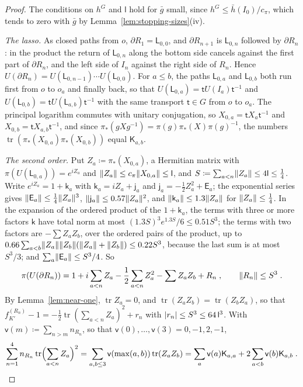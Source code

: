 \documentclass[11pt]{preprint}
\newcommand{\tr}{\operatorname{tr}}
\DeclarePairedDelimiter{\abs}{\lvert}{\rvert}
\DeclarePairedDelimiter{\norm}{\lVert}{\rVert}
\numberwithin{equation}{section}
\theoremstyle{definition}
\theoremstyle{remark}
\theoremstyle{plain}
\begin{document}
\begin{proof}
The conditions on $h^G$ and $\mathsf l$ hold for $\bar g$ small, since $h^G \leq \bar h(I_0)/c_\pi$, which tends to zero with $\bar g$ by Lemma~\ref{lem:stopping-sizes}(iv).

\emph{The lasso.} As closed paths from $o$, $\partial R_1 = \mathsf L_{0,0}$, and $\partial R_{n+1}$ is $\mathsf L_{0,n}$ followed by $\partial R_n$: in the product the return of $\mathsf L_{0,n}$ along the bottom side cancels against the first part of $\partial R_n$, and the left side of $I_n$ against the right side of $R_n$. Hence $U(\partial R_n) = U(\mathsf L_{0,n-1})\cdots U(\mathsf L_{0,0})$. For $a \leq b$, the paths $\mathsf L_{0,a}$ and $\mathsf L_{0,b}$ both run first from $o$ to $o_a$ and finally back, so that $U(\mathsf L_{0,a}) = \mathsf tU(I_a)\mathsf t^{-1}$ and $U(\mathsf L_{0,b}) = \mathsf tU(\mathsf L_{a,b})\mathsf t^{-1}$ with the same transport $\mathsf t \in G$ from $o$ to $o_a$. The principal logarithm commutes with unitary conjugation, so $X_{0,a} = \mathsf tX_a\mathsf t^{-1}$ and $X_{0,b} = \mathsf tX_{a,b}\mathsf t^{-1}$, and since $\pi_*(gXg^{-1}) = \pi(g)\pi_*(X)\pi(g)^{-1}$, the numbers $\tr(\pi_*(X_{0,a})\pi_*(X_{0,b}))$ equal $\mathsf K_{a,b}$.

\emph{The second order.} Put $Z_a \coloneqq \pi_*(X_{0,a})$, a Hermitian matrix with $\pi(U(\mathsf L_{0,a})) = e^{iZ_a}$ and $\norm{Z_a} \leq c_\pi\norm{X_{0,a}} \leq \mathsf l$, and $S \coloneqq \sum_{a<n}\norm{Z_a} \leq 4\mathsf l \leq \frac14$. Write $e^{iZ_a} = 1 + \mathsf k_a$ with $\mathsf k_a = iZ_a + \mathsf j_a$ and $\mathsf j_a = -\frac12Z_a^2 + \mathsf E_a$; the exponential series gives $\norm{\mathsf E_a} \leq \frac14\norm{Z_a}^3$, $\norm{\mathsf j_a} \leq 0.57\norm{Z_a}^2$, and $\norm{\mathsf k_a} \leq 1.3\norm{Z_a}$ for $\norm{Z_a} \leq \frac14$. In the expansion of the ordered product of the $1 + \mathsf k_a$, the terms with three or more factors $\mathsf k$ have total norm at most $(1.3S)^3e^{1.3S}/6 \leq 0.51S^3$; the terms with two factors are $-\sum Z_aZ_b$, over the ordered pairs of the product, up to $0.66\sum_{a<b}\norm{Z_a}\norm{Z_b}(\norm{Z_a} + \norm{Z_b}) \leq 0.22S^3$, because the last sum is at most $S^3/3$; and $\sum_a\norm{\mathsf E_a} \leq S^3/4$. So
\begin{equation}\label{eq:lasso-expansion}
    \pi(U(\partial R_n)) = 1 + i\sum_{a<n}Z_a - \frac12\sum_{a<n}Z_a^2 - \sum Z_aZ_b + R_n\;,
    \qquad
    \norm{R_n} \leq S^3\;.
\end{equation}
By Lemma~\ref{lem:near-one}, $\tr Z_a = 0$, and $\tr(Z_aZ_b) = \tr(Z_bZ_a)$, so that $f^{(R_n)}_{K'} - 1 = -\frac12\tr(\sum_{a<n}Z_a)^2 + r_n$ with $\abs{r_n} \leq S^3 \leq 64\,\mathsf l^3$. With $\mathsf v(m) \coloneqq \sum_{n>m}n_{R_n}$, so that $\mathsf v(0), \dots, \mathsf v(3) = 0, -1, 2, -1$,
\begin{equation}\label{eq:lasso-weights}
    \sum_{n=1}^{4}n_{R_n}\tr\Bigl(\sum_{a<n}Z_a\Bigr)^2 = \sum_{a,b \leq 3}\mathsf v(\max(a, b))\tr(Z_aZ_b) = \sum_a\mathsf v(a)\mathsf K_{a,a} + 2\sum_{a<b}\mathsf v(b)\mathsf K_{a,b}\;.
\end{equation}


\end{proof}
\end{document}
